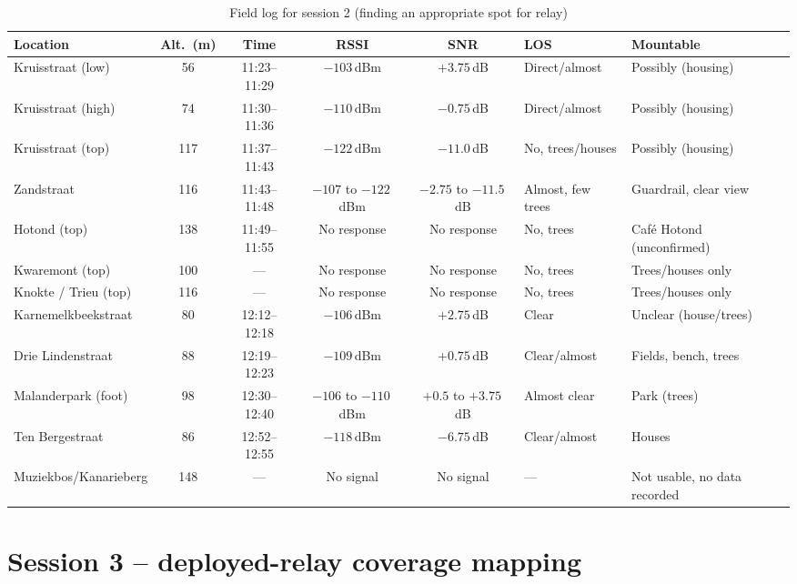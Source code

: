 \begin{table}[h]
  \centering
  \tiny
  \begin{tabular}{lccccll}
    \toprule
    \textbf{Location} & \textbf{Alt.\ (m)} & \textbf{Time} & \textbf{RSSI} & \textbf{SNR} & \textbf{LOS} & \textbf{Mountable} \\
    \midrule
    Kruisstraat (low)    & 56  & 11:23--11:29 & $-103$\,dBm & $+3.75$\,dB  & Direct/almost      & Possibly (housing) \\
    Kruisstraat (high)   & 74  & 11:30--11:36 & $-110$\,dBm & $-0.75$\,dB  & Direct/almost      & Possibly (housing) \\
    Kruisstraat (top)    & 117 & 11:37--11:43 & $-122$\,dBm & $-11.0$\,dB  & No, trees/houses   & Possibly (housing) \\
    Zandstraat            & 116 & 11:43--11:48 & $-107$ to $-122$\,dBm & $-2.75$ to $-11.5$\,dB & Almost, few trees & Guardrail, clear view \\
    Hotond (top)          & 138 & 11:49--11:55 & No response & No response  & No, trees          & Café Hotond (unconfirmed) \\
    Kwaremont (top)       & 100 & ---           & No response & No response  & No, trees          & Trees/houses only \\
    Knokte / Trieu (top)  & 116 & ---           & No response & No response  & No, trees          & Trees/houses only \\
    Karnemelkbeekstraat   & 80  & 12:12--12:18 & $-106$\,dBm & $+2.75$\,dB  & Clear              & Unclear (house/trees) \\
    Drie Lindenstraat     & 88  & 12:19--12:23 & $-109$\,dBm & $+0.75$\,dB  & Clear/almost       & Fields, bench, trees \\
    Malanderpark (foot)   & 98  & 12:30--12:40 & $-106$ to $-110$\,dBm & $+0.5$ to $+3.75$\,dB & Almost clear & Park (trees) \\
    Ten Bergestraat       & 86  & 12:52--12:55 & $-118$\,dBm & $-6.75$\,dB  & Clear/almost       & Houses \\
    Muziekbos/Kanarieberg & 148 & ---           & No signal   & No signal    & ---                & Not usable, no data recorded \\
    \bottomrule
  \end{tabular}
  \caption[Session 2]{\label{tab:bijlage-session2}Field log for session 2 (finding an appropriate spot for relay)}
\end{table}

\section{Session 3 -- deployed-relay coverage mapping}%
\label{sec:bijlage-session3}

